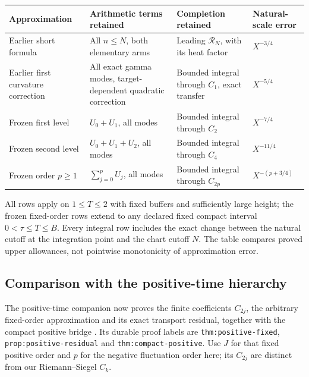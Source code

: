\begin{center}
\small
\begin{tabular}{@{}>{\raggedright\arraybackslash}p{}>{\raggedright\arraybackslash}p{}>{\raggedright\arraybackslash}p{}>{\raggedright\arraybackslash}p{}@{}}
\toprule
Approximation & Arithmetic terms retained & Completion retained &
Natural-scale error\\
\midrule
Earlier short formula &
All \(n\le N\), both elementary arms &
Leading \(\mathcal R_N\), with its heat factor &
\(X^{-3/4}\)\\[3pt]
Earlier first curvature correction &
All exact gamma modes, target-dependent quadratic correction &
Bounded integral through \(C_1\), exact transfer &
\(X^{-5/4}\)\\[3pt]
Frozen first level &
\(U_0+U_1\), all modes &
Bounded integral through \(C_2\) &
\(X^{-7/4}\)\\[3pt]
Frozen second level &
\(U_0+U_1+U_2\), all modes &
Bounded integral through \(C_4\) &
\(X^{-11/4}\)\\[3pt]
Frozen order \(p\ge1\) &
\(\sum_{j=0}^pU_j\), all modes &
Bounded integral through \(C_{2p}\) &
\(X^{-(p+3/4)}\)\\
\bottomrule
\end{tabular}
\end{center}
All rows apply on \(1\le T\le2\) with fixed buffers and sufficiently
large height; the frozen fixed-order rows extend to any declared
fixed compact interval \(0<\tau\le T\le B\).
Every integral row includes the exact change between the natural
cutoff at the integration point and the chart cutoff \(N\).
The table compares proved upper allowances, not pointwise
monotonicity of approximation error.

\subsection{Comparison with the positive-time hierarchy}
\label{subsec:positive-comparison}
The positive-time companion now proves the finite coefficients
\(C_{2j}\), the arbitrary fixed-order approximation and its exact
transport residual, together with the compact positive bridge
\cite{ansatzcomp}. Its durable proof labels are
\texttt{thm:positive-fixed}, \texttt{prop:positive-residual} and
\texttt{thm:compact-positive}. Use \(J\) for that fixed positive
order and \(p\) for the negative fluctuation order here; its
\(C_{2j}\) are distinct from our Riemann--Siegel \(C_k\).

